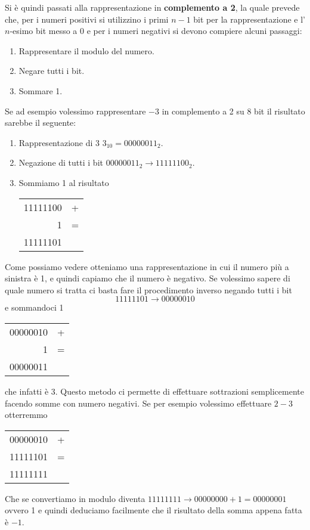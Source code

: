 Si è quindi passati alla rappresentazione in \textbf{complemento a 2}, la quale prevede che, per i
numeri positivi si utilizzino i primi $n-1$ bit per la rappresentazione e l'$n$-esimo bit messo a 0
e per i numeri negativi si devono compiere alcuni passaggi:
\begin{enumerate}
	\item Rappresentare il modulo del numero.
	\item Negare tutti i bit.
	\item Sommare 1.
\end{enumerate}
Se ad esempio volessimo rappresentare $-3$ in complemento a 2 su 8 bit il risultato sarebbe il
seguente:
\begin{enumerate}
	\item Rappresentazione di 3 $3_{10} = 00000011_2$.
	\item Negazione di tutti i bit $00000011_2 \to 11111100_2$.
	\item Sommiamo 1 al risultato
	      \begin{center}
		      \begin{tabular}{r c}
			      11111100 & + \\
			      1        & = \\ \hline
			      11111101
		      \end{tabular}
	      \end{center}
\end{enumerate}
Come possiamo vedere otteniamo una rappresentazione in cui il numero più a sinistra è 1, e quindi
capiamo che il numero è negativo. Se volessimo sapere di quale numero si tratta ci basta fare il
procedimento inverso negando tutti i bit
\[ 11111101 \to 00000010 \]
e sommandoci 1
\begin{center}
	\begin{tabular}{r c}
		00000010 & + \\
		1        & = \\ \hline
		00000011
	\end{tabular}
\end{center}
che infatti è 3. Questo metodo ci permette di effettuare sottrazioni semplicemente facendo somme
con numero negativi. Se per esempio volessimo effettuare $2 - 3$ otterremmo
\begin{center}
	\begin{tabular}{r c}
		00000010 & + \\
		11111101 & = \\ \hline
		11111111
	\end{tabular}
\end{center}
Che se convertiamo in modulo diventa $11111111 \to 00000000 + 1 = 00000001$ ovvero 1 e quindi
deduciamo facilmente che il risultato della somma appena fatta è $-1$.

